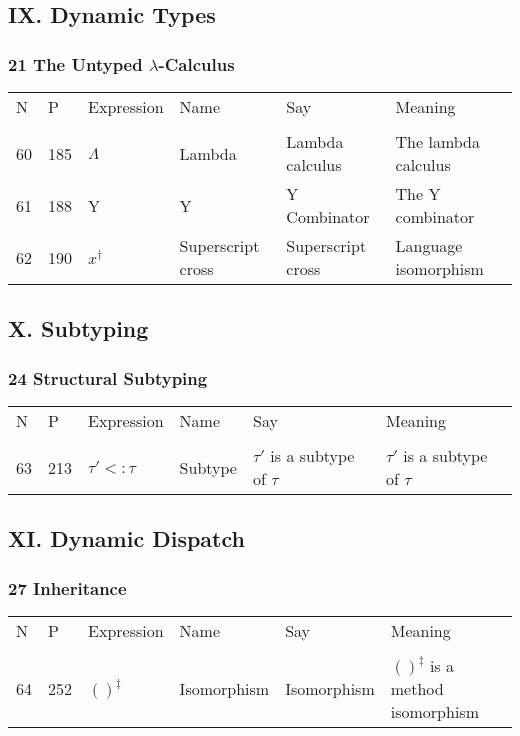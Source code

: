 \documentclass[12pt]{article}
\begin{document}
\subsection*{IX. Dynamic Types}
\subsubsection*{21 The Untyped $\lambda$-Calculus}
\begin{tabular}[b] {p{} p{} p{} p{} 
p{} p{}}
N & P & Expression & Name & Say & Meaning \\ \\

60& 185 & $\Lambda$ & Lambda & Lambda calculus & The lambda calculus \\
61& 188 & Y & Y & Y Combinator & The Y combinator \\
62& 190 & $x^{\dagger}$ & Superscript cross & Superscript cross & Language isomorphism \\

\end{tabular}

\subsection*{X. Subtyping}
\subsubsection*{24 Structural Subtyping}
\begin{tabular}[b] {p{} p{} p{} p{} 
p{} p{}}
N & P & Expression & Name & Say & Meaning \\ \\

63& 213 & $\tau'<:\tau$ & Subtype & $\tau'$ is a subtype of $\tau$ & $\tau'$ is a subtype of $\tau$ \\

\end{tabular}

\subsection*{XI. Dynamic Dispatch}
\subsubsection*{27 Inheritance}
\begin{tabular}[b] {p{} p{} p{} p{} 
p{} p{}}
N & P & Expression & Name & Say & Meaning \\ \\

64& 252 & $()^{\ddagger}$ & Isomorphism & Isomorphism & $()^{\ddagger}$ is a method isomorphism \\

\end{tabular}
\end{document}
